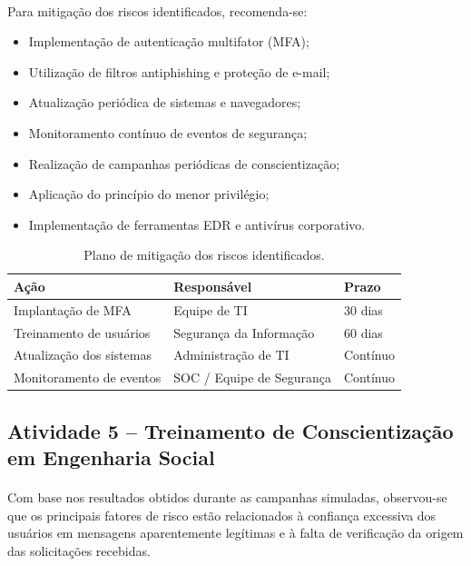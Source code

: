 \paragraph{}
Para mitigação dos riscos identificados, recomenda-se:

\begin{itemize}
    \item Implementação de autenticação multifator (MFA);
    \item Utilização de filtros antiphishing e proteção de e-mail;
    \item Atualização periódica de sistemas e navegadores;
    \item Monitoramento contínuo de eventos de segurança;
    \item Realização de campanhas periódicas de conscientização;
    \item Aplicação do princípio do menor privilégio;
    \item Implementação de ferramentas EDR e antivírus corporativo.
\end{itemize}

\begin{table}[H]
\centering
\small
\begin{tabular}{|p{5cm}|p{4cm}|p{2.5cm}|}
\hline
\textbf{Ação} & \textbf{Responsável} & \textbf{Prazo} \\
\hline
Implantação de MFA & Equipe de TI & 30 dias \\
\hline
Treinamento de usuários & Segurança da Informação & 60 dias \\
\hline
Atualização dos sistemas & Administração de TI & Contínuo \\
\hline
Monitoramento de eventos & SOC / Equipe de Segurança & Contínuo \\
\hline
\end{tabular}
\caption{Plano de mitigação dos riscos identificados.}
\end{table}

\subsection{Atividade 5 -- Treinamento de Conscientização em Engenharia Social}

\paragraph{}
Com base nos resultados obtidos durante as campanhas simuladas, observou-se que
os principais fatores de risco estão relacionados à confiança excessiva dos
usuários em mensagens aparentemente legítimas e à falta de verificação da
origem das solicitações recebidas.

